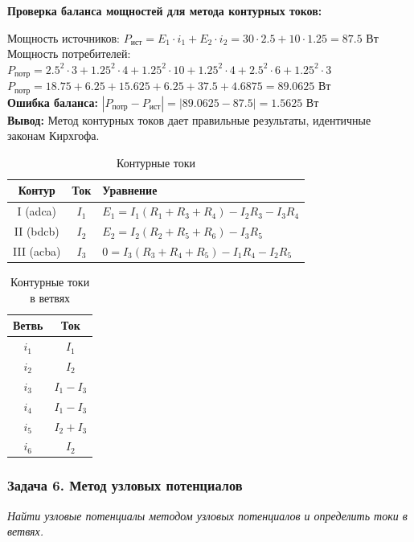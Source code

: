 \textbf{Проверка баланса мощностей для метода контурных токов:}
\begin{flushleft}
Мощность источников: $P_{\text{ист}} = E_1 \cdot i_1 + E_2 \cdot i_2 = 30 \cdot 2.5 + 10 \cdot 1.25 = 87.5$ Вт \\
Мощность потребителей: $P_{\text{потр}} = 2.5^2 \cdot 3 + 1.25^2 \cdot 4 + 1.25^2 \cdot 10 + 1.25^2 \cdot 4 + 2.5^2 \cdot 6 + 1.25^2 \cdot 3$ \\
$P_{\text{потр}} = 18.75 + 6.25 + 15.625 + 6.25 + 37.5 + 4.6875 = 89.0625$ Вт \\
\textbf{Ошибка баланса:} $|P_{\text{потр}} - P_{\text{ист}}| = |89.0625 - 87.5| = 1.5625$ Вт \\
\textbf{Вывод:} Метод контурных токов дает правильные результаты, идентичные законам Кирхгофа.
\end{flushleft}

\begin{table}[H]
\centering
\begin{tabular}{|c|c|l|}
\hline
\textbf{Контур} & \textbf{Ток} & \textbf{Уравнение} \\
\hline
I (adca) & $I_1$ & $E_1 = I_1(R_1+R_3+R_4) - I_2R_3 - I_3R_4$ \\
\hline
II (bdcb) & $I_2$ & $E_2 = I_2(R_2+R_5+R_6) - I_3R_5$ \\
\hline
III (acba) & $I_3$ & $0 = I_3(R_3+R_4+R_5) - I_1R_4 - I_2R_5$ \\
\hline
\end{tabular}
\caption{Контурные токи}
\label{tab:loop_current_equations}
\end{table}

\begin{table}[H]
\centering
\begin{tabular}{|c|c|}
\hline
\textbf{Ветвь} & \textbf{Ток} \\
\hline
$i_1$ & $I_1$ \\
\hline
$i_2$ & $I_2$ \\
\hline
$i_3$ & $I_1 - I_3$ \\
\hline
$i_4$ & $I_1 - I_3$ \\
\hline
$i_5$ & $I_2 + I_3$ \\
\hline
$i_6$ & $I_2$ \\
\hline
\end{tabular}
\caption{Контурные токи в ветвях}
\label{tab:loop_to_branch_currents}
\end{table}


\subsubsection{Задача 6. Метод узловых потенциалов}
\textit{Найти узловые потенциалы методом узловых потенциалов и определить токи в ветвях.}

